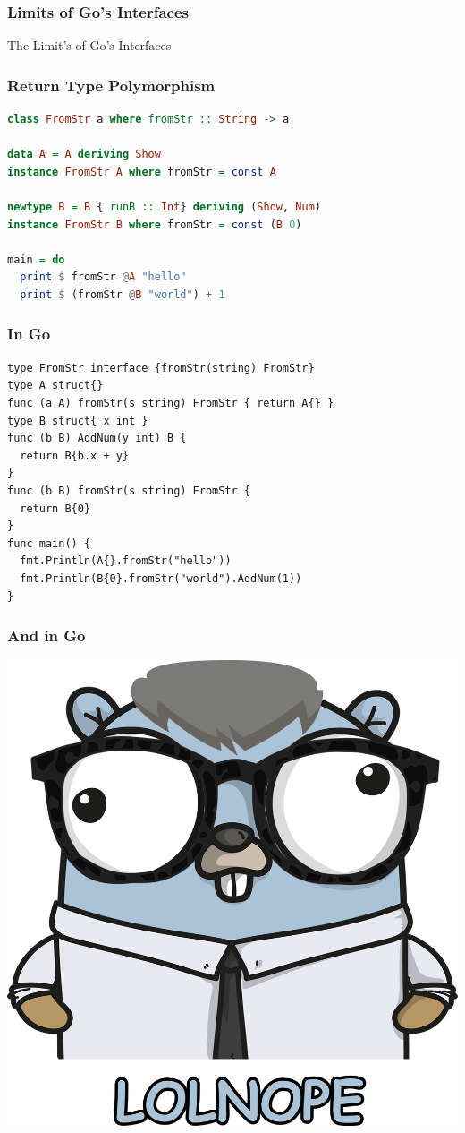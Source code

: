 \documentclass{beamer}
\newcommand{\hugecenter}[1]{\begin{center}\begin{huge}#1\end{huge}\end{center}}
\begin{document}
\begin{frame}
  \frametitle{Limits of Go's Interfaces}
  \hugecenter{The Limit's of Go's Interfaces}
\end{frame}

\begin{frame}[fragile]
  \frametitle{Return Type Polymorphism}
\begin{lstlisting}[language=Haskell]
class FromStr a where fromStr :: String -> a

data A = A deriving Show
instance FromStr A where fromStr = const A

newtype B = B { runB :: Int} deriving (Show, Num)
instance FromStr B where fromStr = const (B 0)

main = do
  print $ fromStr @A "hello"
  print $ (fromStr @B "world") + 1
\end{lstlisting}
\end{frame}

\begin{frame}[fragile]
  \frametitle{In Go}
\begin{lstlisting}[language=Golang]
type FromStr interface {fromStr(string) FromStr}
type A struct{}
func (a A) fromStr(s string) FromStr { return A{} }
type B struct{ x int }
func (b B) AddNum(y int) B {
  return B{b.x + y}
}
func (b B) fromStr(s string) FromStr {
  return B{0}
}
func main() {
  fmt.Println(A{}.fromStr("hello"))
  fmt.Println(B{0}.fromStr("world").AddNum(1))
}
\end{lstlisting}
\end{frame}

\begin{frame}
  \frametitle{And in Go}
  \begin{center}
    \includegraphics[height=.8\paperheight]{img/nopher}
  \end{center}
\end{frame}
\end{document}

